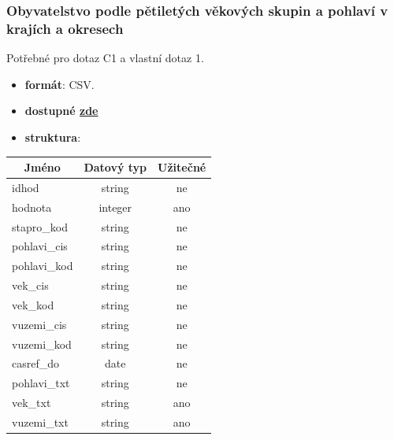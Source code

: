 \documentclass[12pt]{article}
\begin{document}
\subsubsection*{Obyvatelstvo podle pětiletých věkových skupin a pohlaví v krajích a okresech}        
Potřebné pro dotaz C1 a vlastní dotaz 1.
\begin{itemize}
    \item \textbf{formát}: CSV.
    \item \textbf{dostupné  \href{https://www.czso.cz/documents/62353418/143522504/130142-21data043021.csv/760fab9c-d079-4d3a-afed-59cbb639e37d?version=1.1}{zde}}
    \item \textbf{struktura}:
\end{itemize}
        \begin{center}
            \begin{tabular}{ |l|c|c| } 
                \hline
                \multicolumn{1}{|c|}{Jméno} & Datový typ & Užitečné \\
                \hline
                \hline
                idhod & string & ne \\ 
                \hline
                hodnota & integer & ano \\ 
                \hline
                stapro\_kod & string & ne \\ 
                \hline
                pohlavi\_cis & string & ne \\ 
                \hline
                pohlavi\_kod & string & ne \\ 
                \hline
                vek\_cis & string & ne \\ 
                \hline
                vek\_kod & string & ne \\ 
                \hline
                vuzemi\_cis & string & ne \\ 
                \hline
                vuzemi\_kod & string & ne \\ 
                \hline
                casref\_do & date & ne \\ 
                \hline
                pohlavi\_txt & string & ne \\ 
                \hline
                vek\_txt & string & ano \\ 
                \hline
                vuzemi\_txt & string & ano \\ 
                \hline
            \end{tabular}
        \end{center} 
\end{document}
